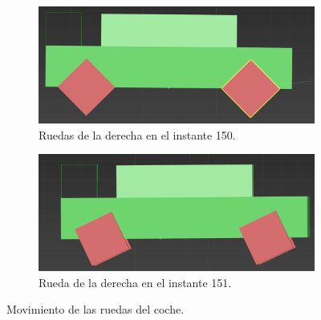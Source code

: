 \begin{figure}[H]
    \centering
    \begin{subfigure}[t]{0.48\textwidth}
        \centering
        \includegraphics[width=\textwidth]{imagenes/coche/ruedas/antes.png}
        \caption{Ruedas de la derecha en el instante 150.}
    \end{subfigure}
    \hfill
    \begin{subfigure}[t]{0.48\textwidth}
        \centering
        \includegraphics[width=\textwidth]{imagenes/coche/ruedas/despues.png}
        \caption{Rueda de la derecha en el instante 151.}
    \end{subfigure}
    \caption{Movimiento de las ruedas del coche.}
\end{figure}